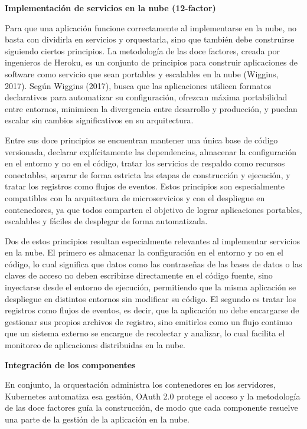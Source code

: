 \documentclass[12pt,letterpaper]{article}
\newcommand{\subtitulo}[1]{\vspace{12pt}\noindent\textbf{#1}\par\vspace{10pt}}
\begin{document}
\subtitulo{Implementación de servicios en la nube (12-factor)}
Para que una aplicación funcione correctamente al implementarse en la nube, no basta con dividirla en servicios y orquestarla, sino que también debe construirse siguiendo ciertos principios. La metodología de las doce factores, creada por ingenieros de Heroku, es un conjunto de principios para construir aplicaciones de software como servicio que sean portables y escalables en la nube (Wiggins, 2017). Según Wiggins (2017), busca que las aplicaciones utilicen formatos declarativos para automatizar su configuración, ofrezcan máxima portabilidad entre entornos, minimicen la divergencia entre desarrollo y producción, y puedan escalar sin cambios significativos en su arquitectura.

Entre sus doce principios se encuentran mantener una única base de código versionada, declarar explícitamente las dependencias, almacenar la configuración en el entorno y no en el código, tratar los servicios de respaldo como recursos conectables, separar de forma estricta las etapas de construcción y ejecución, y tratar los registros como flujos de eventos. Estos principios son especialmente compatibles con la arquitectura de microservicios y con el despliegue en contenedores, ya que todos comparten el objetivo de lograr aplicaciones portables, escalables y fáciles de desplegar de forma automatizada.

Dos de estos principios resultan especialmente relevantes al implementar servicios en la nube. El primero es almacenar la configuración en el entorno y no en el código, lo cual significa que datos como las contraseñas de las bases de datos o las claves de acceso no deben escribirse directamente en el código fuente, sino inyectarse desde el entorno de ejecución, permitiendo que la misma aplicación se despliegue en distintos entornos sin modificar su código. El segundo es tratar los registros como flujos de eventos, es decir, que la aplicación no debe encargarse de gestionar sus propios archivos de registro, sino emitirlos como un flujo continuo que un sistema externo se encargue de recolectar y analizar, lo cual facilita el monitoreo de aplicaciones distribuidas en la nube.

\subtitulo{Integración de los componentes}
En conjunto, la orquestación administra los contenedores en los servidores, Kubernetes automatiza esa gestión, OAuth 2.0 protege el acceso y la metodología de las doce factores guía la construcción, de modo que cada componente resuelve una parte de la gestión de la aplicación en la nube.
\end{document}

